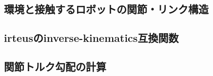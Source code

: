 \documentclass[]{jarticle}
\begin{document}
\subsection{環境と接触するロボットの関節・リンク構造} \label{sec:robot-environment}


\subsection{irteusのinverse-kinematics互換関数} \label{sec:ik-wrapper}

\subsection{関節トルク勾配の計算} \label{sec:torque-jacobian}

\end{document}

